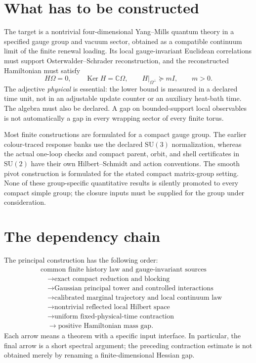 \documentclass[11pt,oneside,openany]{book}
\theoremstyle{definition}
\theoremstyle{remark}
\newcommand{\C}{\mathbb C}
\newcommand{\Ker}{\operatorname{Ker}}
\newcommand{\SU}{\mathrm{SU}}
\begin{document}
\section{What has to be constructed}
The target is a nontrivial four-dimensional Yang--Mills quantum theory in a specified gauge group and vacuum sector, obtained as a compatible continuum limit of the finite renewal loading. Its local gauge-invariant Euclidean correlations must support Osterwalder--Schrader reconstruction, and the reconstructed Hamiltonian must satisfy
\begin{equation}\label{eq:target}
H\Omega=0,\qquad \Ker H=\C\Omega,\qquad
H|_{\Omega^\perp}\succeq mI,\qquad m>0.
\end{equation}
The adjective \emph{physical} is essential: the lower bound is measured in a declared time unit, not in an adjustable update counter or an auxiliary heat-bath time. The algebra must also be declared. A gap on bounded-support local observables is not automatically a gap in every wrapping sector of every finite torus.

Most finite constructions are formulated for a compact gauge group. The earlier colour-traced response banks use the declared $\SU(3)$ normalization, whereas the actual one-loop checks and compact parent, orbit, and shell certificates in $\SU(2)$ have their own Hilbert--Schmidt and action conventions. The smooth pivot construction is formulated for the stated compact matrix-group setting. None of these group-specific quantitative results is silently promoted to every compact simple group; the closure inputs must be supplied for the group under consideration.

\section{The dependency chain}
The principal construction has the following order:
\begin{equation}\label{eq:main-chain}
\begin{aligned}
&\text{common finite history law and gauge-invariant sources}\\
&\quad\longrightarrow\text{exact compact reduction and blocking}\\
&\quad\longrightarrow\text{Gaussian principal tower and controlled interactions}\\
&\quad\longrightarrow\text{calibrated marginal trajectory and local continuum law}\\
&\quad\longrightarrow\text{nontrivial reflected local Hilbert space}\\
&\quad\longrightarrow\text{uniform fixed-physical-time contraction}\\
&\quad\longrightarrow\text{positive Hamiltonian mass gap}.
\end{aligned}
\end{equation}
Each arrow means a theorem with a specific input interface. In particular, the final arrow is a short spectral argument; the preceding contraction estimate is not obtained merely by renaming a finite-dimensional Hessian gap.
\end{document}
